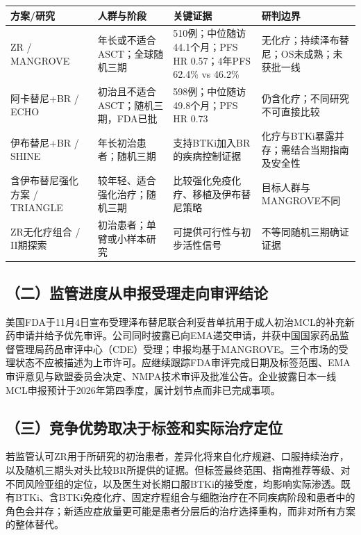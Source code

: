 \documentclass[a4paper,10pt,fontset=none]{ctexart}
\begin{document}
\begin{center}\linespread{1.0}\selectfont
\begin{tabularx}{0.98\textwidth}{>{\centering\arraybackslash}p{2.25cm} >{\centering\arraybackslash}p{2.15cm} X >{\centering\arraybackslash}p{2.3cm}}
\toprule
方案/研究 & 人群与阶段 & 关键证据 & 研判边界 \\
\midrule
ZR / MANGROVE & 年长或不适合ASCT；全球随机三期 & 510例；中位随访44.1个月；PFS HR 0.57；4年PFS 62.4\% vs 46.2\% & 无化疗；持续泽布替尼；OS未成熟；未获批一线 \\
阿卡替尼+BR / ECHO & 初治且不适合ASCT；随机三期，FDA已批 & 598例；中位随访49.8个月；PFS HR 0.73 & 仍含化疗；不同研究不可直接比较 \\
伊布替尼+BR / SHINE & 年长初治患者；随机三期 & 支持BTKi加入BR的疾病控制证据 & 化疗与BTKi暴露并存；需结合当期指南及安全性 \\
含伊布替尼强化方案 / TRIANGLE & 较年轻、适合强化治疗；随机三期 & 比较强化免疫化疗、移植及伊布替尼策略 & 目标人群与MANGROVE不同 \\
ZR无化疗组合 / II期探索 & 初治患者；单臂或小样本研究 & 可提供可行性与初步活性信号 & 不等同随机三期确证证据 \\
\bottomrule
\end{tabularx}
\end{center}
\RUCTableAfterSpace

\subsection*{（二）监管进度从申报受理走向审评结论}
美国FDA于11月4日宣布受理泽布替尼联合利妥昔单抗用于成人初治MCL的补充新药申请并给予优先审评。公司同时披露已向EMA递交申请，并获中国国家药品监督管理局药品审评中心（CDE）受理；申报均基于MANGROVE。三个市场的受理状态不应被描述为上市许可。应继续跟踪FDA审评完成日期及标签范围、EMA审评意见与欧盟委员会决定、NMPA技术审评及批准公告。企业披露日本一线MCL申报预计于2026年第四季度，属计划节点而非已完成事项。

\subsection*{（三）竞争优势取决于标签和实际治疗定位}
若监管认可ZR用于所研究的初治患者，差异化将来自化疗规避、口服持续治疗，以及随机三期头对头比较BR所提供的证据。但标签最终范围、指南推荐等级、对不同风险亚组的定位，以及医生对长期口服BTKi的接受度，均影响实际渗透。既有BTKi、含BTKi免疫化疗、固定疗程组合与细胞治疗在不同疾病阶段和患者中的角色会并存；新适应症放量更可能是患者分层后的治疗选择重构，而非对所有方案的整体替代。
\end{document}
